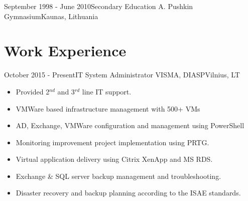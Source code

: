 \documentclass[11pt,a4paper]{moderncv}
\begin{document}
\cventry
	{September 1998 - June 2010}{Secondary Education}
	{A. Pushkin Gymnasium}{Kaunas, Lithuania}
	{}{}
		
\section{Work Experience}

\cventry
	{October 2015 - Present}{IT System Administrator}
	{VISMA, DIASP}{Vilnius, LT}
	{}{
        \begin{itemize}
            \item Provided 2$^{nd}$ and 3$^{rd}$ line IT support.
            \item VMWare based infrastructure management with 500+ VMs
            \item AD, Exchange, VMWare configuration and management using PowerShell
            \item Monitoring improvement project implementation using PRTG.
            \item Virtual application delivery using Citrix XenApp and MS RDS.
            \item Exchange \& SQL server backup management and troubleshooting.
            \item Disaster recovery and backup planning according to the ISAE standards.
        \end{itemize}
        }
\end{document}
